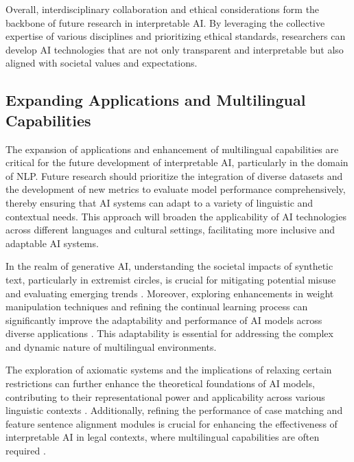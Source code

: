Overall, interdisciplinary collaboration and ethical considerations form the backbone of future research in interpretable AI. By leveraging the collective expertise of various disciplines and prioritizing ethical standards, researchers can develop AI technologies that are not only transparent and interpretable but also aligned with societal values and expectations.



\subsection{Expanding Applications and Multilingual Capabilities} \label{subsec:Expanding Applications and Multilingual Capabilities}



The expansion of applications and enhancement of multilingual capabilities are critical for the future development of interpretable AI, particularly in the domain of NLP. Future research should prioritize the integration of diverse datasets and the development of new metrics to evaluate model performance comprehensively, thereby ensuring that AI systems can adapt to a variety of linguistic and contextual needs. This approach will broaden the applicability of AI technologies across different languages and cultural settings, facilitating more inclusive and adaptable AI systems.



In the realm of generative AI, understanding the societal impacts of synthetic text, particularly in extremist circles, is crucial for mitigating potential misuse and evaluating emerging trends \cite{mcguffie2020radicalizationrisksgpt3advanced}. Moreover, exploring enhancements in weight manipulation techniques and refining the continual learning process can significantly improve the adaptability and performance of AI models across diverse applications \cite{chitale2023taskarithmeticloracontinual}. This adaptability is essential for addressing the complex and dynamic nature of multilingual environments.



The exploration of axiomatic systems and the implications of relaxing certain restrictions can further enhance the theoretical foundations of AI models, contributing to their representational power and applicability across various linguistic contexts \cite{cieslinski2022axiomstypefreesubjectiveprobability}. Additionally, refining the performance of case matching and feature sentence alignment modules is crucial for enhancing the effectiveness of interpretable AI in legal contexts, where multilingual capabilities are often required \cite{lin2023interpretabilityframeworksimilarcase}.



